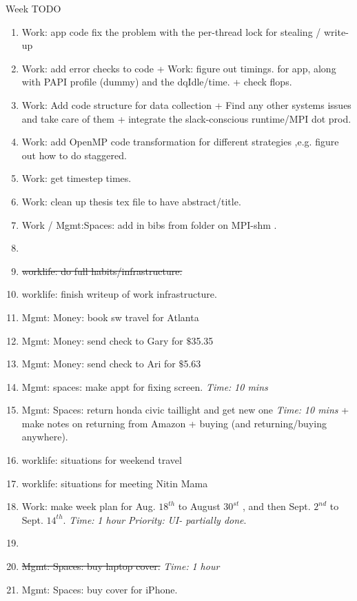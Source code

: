 \documentclass[serif, mathserif, final]{beamer}
\newcommand{\doneTask}[1]{\item \sout{#1}}
\newcommand{\timeEst}[1]{\textit{Time:} \textit{#1}}
\newcommand{\priority}[1]{\textit{Priority:} \textit{#1}}
\begin{document}
\begin{frame}{}
\begin{columns}
\begin{column}{0.50\linewidth}
\begin{block}{ Week TODO}
\begin{enumerate}
\item \tiny Work: app code fix the problem with the per-thread lock for stealing / write-up 
\item \tiny Work: add error checks to code + Work: figure out timings. 
  for app, along with PAPI profile (dummy) and the dqIdle/time. + check flops. 
\item \tiny Work: Add code structure for data collection + Find any other systems issues and take care of them + integrate the
  slack-conscious runtime/MPI dot prod. 

\item \tiny Work: add OpenMP code transformation for different strategies ,e.g. figure out how to do staggered. 
\item \tiny Work: get timestep times. 

\tiny \item \tiny Work: clean up thesis tex file to have abstract/title. 
\tiny \item \tiny Work / Mgmt:Spaces: add in bibs from folder on MPI-shm . 

\item \tiny \doneTask{worklife: do full habits/infrastructure.} 
\item \tiny worklife: finish writeup of work infrastructure. 

\item \tiny Mgmt: Money: book sw travel for Atlanta 
\item \tiny Mgmt: Money: send check to Gary for $\$$35.35 
\item \tiny Mgmt: Money: send check to Ari for $\$$5.63 
\item \tiny Mgmt: spaces: make appt for fixing screen. \timeEst{10 mins}  
\item \tiny Mgmt: Spaces: return honda civic taillight and get new one \timeEst{10 mins}  + make notes on returning from Amazon + buying  (and returning/buying anywhere). 

\item \tiny worklife: situations for weekend travel 
\item \tiny worklife: situations for meeting Nitin Mama 
\item \tiny Work: make week plan for Aug. $18^{th}$ to August $30^{st}$ , and then Sept. $2^{nd}$ to Sept. $14^{th}$. \timeEst{1 hour} \priority{UI- partially done}.  
\item \tiny \doneTask{Mgmt: Spaces: buy laptop cover.} \timeEst{1 hour} 

\item \tiny Mgmt: Spaces: buy cover for iPhone. 



\end{enumerate}
\end{block}
\end{column}
\end{columns}
\end{frame}
\end{document}
